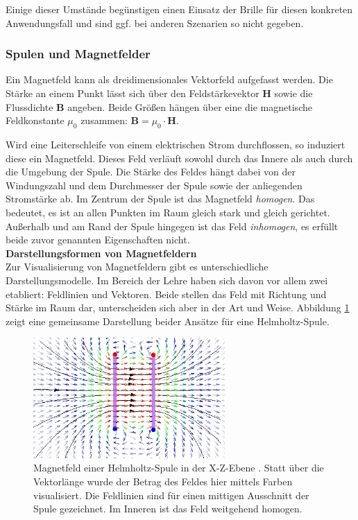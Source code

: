 Einige dieser Umstände begünstigen einen Einsatz der Brille für diesen konkreten Anwendungsfall und sind ggf. bei anderen Szenarien so nicht gegeben.\\

\subsubsection{Spulen und Magnetfelder}
\label{sec-2-3-2}
Ein Magnetfeld kann als dreidimensionales Vektorfeld aufgefasst werden. Die Stärke an einem Punkt lässt sich über den Feldstärkevektor $\boldsymbol{H}$ sowie die Flussdichte $\boldsymbol{B}$ angeben. Beide Größen hängen über eine die magnetische Feldkonstante $\mu_{0}$ zusammen: $\boldsymbol{B} = \mu_{0} \cdot \boldsymbol{H}$.
\par
\noindent\hspace*{5mm}
Wird eine Leiterschleife von einem elektrischen Strom durchflossen, so induziert diese ein Magnetfeld. Dieses Feld verläuft sowohl durch das Innere als auch durch die Umgebung der Spule. Die Stärke des Feldes hängt dabei von der Windungszahl und dem Durchmesser der Spule sowie der anliegenden Stromstärke ab.
Im Zentrum der Spule ist das Magnetfeld \textit{homogen}. Das bedeutet, es ist an allen Punkten im Raum gleich stark und gleich gerichtet. Außerhalb und am Rand der Spule hingegen ist das Feld \textit{inhomogen}, es erfüllt beide zuvor genannten Eigenschaften nicht.\\

\textbf{Darstellungsformen von Magnetfeldern}\\
Zur Visualisierung von Magnetfeldern gibt es unterschiedliche Darstellungsmodelle. Im Bereich der Lehre haben sich davon vor allem zwei etabliert: Feldlinien und Vektoren. Beide stellen das Feld mit Richtung und Stärke im Raum dar, unterscheiden sich aber in der Art und Weise. Abbildung \ref{img:Magnetfeld-Helmholtzspule} zeigt eine gemeinsame Darstellung beider Ansätze für eine Helmholtz-Spule.\\

\begin{figure}[h!]
	\centering
	\includegraphics[width=0.65\textwidth]{images/papers/Magnetfeld-Helmholtzspule.jpg}
	\caption{Magnetfeld einer Helmholtz-Spule in der X-Z-Ebene \cite{wiki:15}. Statt über die Vektorlänge wurde der Betrag des Feldes hier mittels Farben visualisiert. Die Feldlinien sind für einen mittigen Ausschnitt der Spule gezeichnet. Im Inneren ist das Feld weitgehend homogen.} %
	\label{img:Magnetfeld-Helmholtzspule}
\end{figure}


